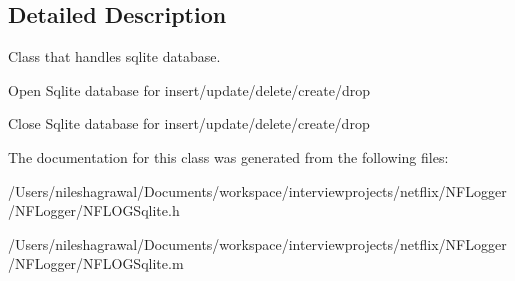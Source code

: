 \subsection{Detailed Description}
Class that handles sqlite database. 


\begin{DoxyItemize}
\item Open Sqlite database for insert/update/delete/create/drop
\item Close Sqlite database for insert/update/delete/create/drop 
\end{DoxyItemize}

The documentation for this class was generated from the following files\+:\begin{DoxyCompactItemize}
\item 
/\+Users/nileshagrawal/\+Documents/workspace/interviewprojects/netflix/\+N\+F\+Logger/\+N\+F\+Logger/N\+F\+L\+O\+G\+Sqlite.\+h\item 
/\+Users/nileshagrawal/\+Documents/workspace/interviewprojects/netflix/\+N\+F\+Logger/\+N\+F\+Logger/N\+F\+L\+O\+G\+Sqlite.\+m\end{DoxyCompactItemize}

